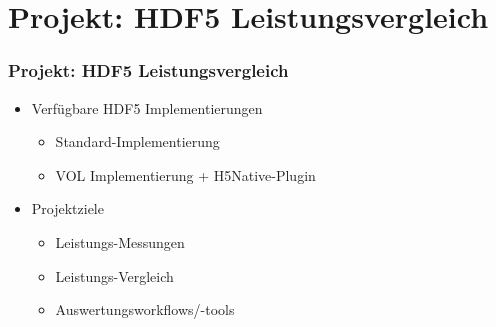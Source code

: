 \section{Projekt: HDF5 Leistungsvergleich}
\begin{frame}
	\frametitle{Projekt: HDF5 Leistungsvergleich}
	\begin{itemize}
		\item Verfügbare HDF5 Implementierungen
			\begin{itemize}
				\item Standard-Implementierung
				\item VOL Implementierung + H5Native-Plugin
			\end{itemize}
	\end{itemize}

	\begin{itemize}
		\item Projektziele
			\begin{itemize}
				\item Leistungs-Messungen
				\item Leistungs-Vergleich
				\item Auswertungsworkflows/-tools
			\end{itemize}
	\end{itemize}
\end{frame}



